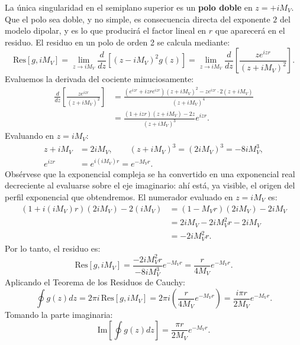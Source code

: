 \documentclass[10pt,a4paper]{article}
\begin{document}
La única singularidad en el semiplano superior es un \textbf{polo doble} en $z = +i M_V$. Que el polo sea doble, y no simple, es consecuencia directa del exponente $2$ del modelo dipolar, y es lo que producirá el factor lineal en $r$ que aparecerá en el residuo. El residuo en un polo de orden 2 se calcula mediante:
\begin{equation}
\text{Res}[g, iM_V] = \lim_{z \to iM_V} \frac{d}{dz} \left[ (z - iM_V)^2 g(z) \right] = \lim_{z \to iM_V} \frac{d}{dz} \left[ \frac{z e^{izr}}{(z + iM_V)^2} \right].
\end{equation}
Evaluemos la derivada del cociente minuciosamente:
\begin{align}
\frac{d}{dz} \left[ \frac{z e^{izr}}{(z + iM_V)^2} \right] &= \frac{\left( e^{izr} + i z r e^{izr} \right)(z + iM_V)^2 - z e^{izr} \cdot 2(z + iM_V)}{(z + iM_V)^4} \nonumber \\
&= \frac{(1 + i z r)(z + iM_V) - 2z}{(z + iM_V)^3} e^{izr}.
\end{align}
Evaluando en $z = i M_V$:
\begin{align}
z + iM_V &= 2i M_V, \qquad (z + iM_V)^3 = (2i M_V)^3 = -8i M_V^3, \\
e^{izr} &= e^{i(iM_V)r} = e^{-M_V r}.
\end{align}
Obsérvese que la exponencial compleja se ha convertido en una exponencial real decreciente al evaluarse sobre el eje imaginario: ahí está, ya visible, el origen del perfil exponencial que obtendremos. El numerador evaluado en $z = i M_V$ es:
\begin{align}
(1 + i(iM_V)r)(2i M_V) - 2(iM_V) &= (1 - M_V r)(2i M_V) - 2i M_V \nonumber \\
&= 2i M_V - 2i M_V^2 r - 2i M_V \nonumber \\
&= - 2i M_V^2 r.
\end{align}
Por lo tanto, el residuo es:
\begin{equation}
\text{Res}[g, iM_V] = \frac{-2i M_V^2 r}{-8i M_V^3} e^{-M_V r} = \frac{r}{4 M_V} e^{-M_V r}.
\end{equation}
Aplicando el Teorema de los Residuos de Cauchy:
\begin{equation}
\oint g(z) dz = 2\pi i \, \text{Res}[g, iM_V] = 2\pi i \left( \frac{r}{4 M_V} e^{-M_V r} \right) = \frac{i \pi r}{2 M_V} e^{-M_V r}.
\end{equation}
Tomando la parte imaginaria:
\begin{equation}
\text{Im} \left[ \oint g(z) dz \right] = \frac{\pi r}{2 M_V} e^{-M_V r}.
\end{equation}
\end{document}
